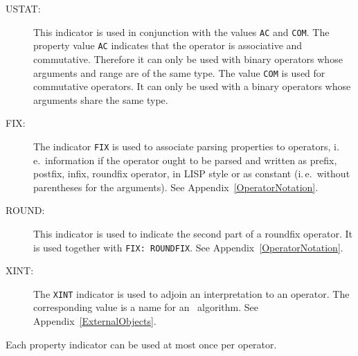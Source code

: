 \begin{description}
\item[USTAT:] This indicator is used in conjunction with the
values {\tt AC} and {\tt COM}. The property value {\tt AC} indicates
that the operator is associative and commutative. Therefore it can
only be used with binary operators whose arguments and range 
are of the same type.
The value {\tt COM} is used for commutative operators. It can only be
used with a binary operators whose arguments share the same type.

\item[FIX:]
The indicator {\tt FIX} is used to associate parsing properties
to operators, i.\,e.\ information if the operator ought to be parsed and
written as prefix, postfix, infix, roundfix operator, in LISP style
or as constant (i.\,e.\ without parentheses for the arguments).
See Appendix~\ref{OperatorNotation}.

\item[ROUND:] This indicator is used to indicate the second part of a
roundfix operator. It is used together with {\tt FIX: ROUNDFIX}.
See Appendix~\ref{OperatorNotation}.

\item[XINT:]
The {\tt XINT} indicator is used to adjoin an interpretation to an
operator. The corresponding value is a name for an \ALDES\ algorithm.
See Appendix~\ref{ExternalObjects}.
\end{description}

Each property indicator can be used at most once per operator.

